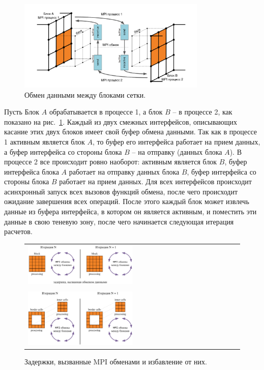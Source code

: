 \begin{figure}[ht]
\centering
\includegraphics[width=0.8\textwidth]{fig/par_10-data-exchange.pdf}
\singlespacing
{}\caption{Обмен данными между блоками сетки.}
\label{fig:text_2_block_data_exchange}
\end{figure}

Пусть Блок $A$ обрабатывается в процессе 1, а блок $B$ -- в процессе 2, как показано на рис.~\ref{fig:text_2_block_data_exchange}.
Каждый из двух смежных интерфейсов, описывающих касание этих двух блоков имеет свой буфер обмена данными.
Так как в процессе 1 активным является блок $A$, то буфер его интерфейса работает на прием данных, а буфер интерфейса со стороны блока $B$ -- на отправку (данных блока $A$).
В процессе 2 все происходит ровно наоборот: активным является блок $B$, буфер интерфейса блока $A$ работает на отправку данных блока $B$, буфер интерфейса со стороны блока $B$ работает на прием данных.
Для всех интерфейсов происходит асинхронный запуск всех вызовов функций обмена, после чего происходит ожидание завершения всех операций.
После этого каждый блок может извлечь данные из буфера интерфейса, в котором он является активным, и поместить эти данные в свою теневую зону, после чего начинается следующая итерация расчетов.

\begin{figure}[ht]
\centering
\begin{tabular}{l}
\includegraphics[width=0.5\textwidth]{fig/par_11-mpi1.png}
\\
\\
\includegraphics[width=0.5\textwidth]{fig/par_12-mpi2.png}
\end{tabular}
\singlespacing
{}\caption{Задержки, вызванные MPI\label{abbr:mpi-3} обменами и избавление от них.}
\label{fig:text_2_block_mpi1}
\end{figure}

